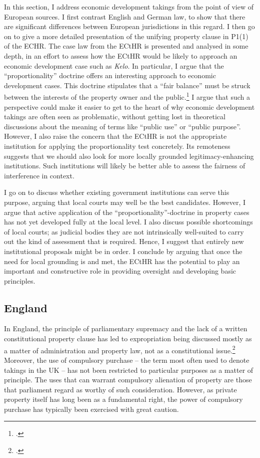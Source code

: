 In this section, I address economic development takings from the point of view of European sources. I first contrast English and German law, to show that there are significant differences between European jurisdictions in this regard. I then go on to give a more detailed presentation of the unifying property clause in P1(1) of the ECHR. The case law from the ECtHR is presented and analysed in some depth, in an effort to assess how the ECtHR would be likely to approach an economic development case such as {\it Kelo}. In particular, I argue that the ``proportionality'' doctrine offers an interesting approach to economic development cases. This doctrine stipulates that a ``fair balance'' must be struck  between the interests of the property owner and the public.\footcite[Chapter 5]{allen05} I argue that such a perspective could make it easier to get to the heart of why economic development takings are often seen as problematic, without getting lost in theoretical discussions about the meaning of  terms like ``public use'' or ``public purpose''. However, I also raise the concern that the ECtHR is not the appropriate institution for applying the proportionality test concretely. Its remoteness suggests that we should also look for more locally grounded legitimacy-enhancing institutions. Such institutions will likely be better able to assess the fairness of interference in context.

I go on to discuss whether existing government institutions can serve this purpose, arguing that local courts may well be the best candidates. However, I argue that active application of the ``proportionality''-doctrine in property cases has not yet developed fully at the local level. I also discuss possible shortcomings of local courts; as judicial bodies they are not intrinsically well-suited to carry out the kind of assessment that is required. Hence, I suggest that entirely new institutional proposals might be in order. I conclude by arguing that once the need for local grounding is  and met, the ECtHR has the potential to play an important and constructive role in providing oversight and developing basic principles.

\subsection{England}\label{sec:england}

In England, the principle of parliamentary supremacy and the lack of a written constitutional property clause has led to expropriation being discussed mostly as a matter of administration and property law, not as a constitutional issue.\footcite{taggart98} Moreover, the use of compulsory purchase -- the term most often used to denote takings in the UK -- has not been restricted to particular purposes as a matter of principle. The uses that can warrant compulsory alienation of property are those that parliament regard as worthy of such consideration. However, as private property itself has long been  as a fundamental right, the power of compulsory purchase has typically been exercised with great caution. 

